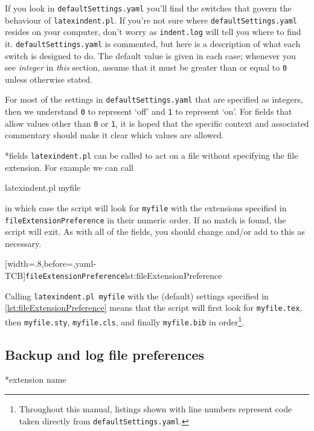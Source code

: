 \documentclass[10pt]{article}
\begin{document}
 If you look in \texttt{defaultSettings.yaml} you'll find the switches that govern the
 behaviour of \texttt{latexindent.pl}. If you're not sure where
 \texttt{defaultSettings.yaml} resides on your computer, don't worry as
 \texttt{indent.log} will tell you where to find it. \texttt{defaultSettings.yaml} is
 commented, but here is a description of what each switch is designed to do. The default
 value is given in each case; whenever you see \emph{integer} in \emph{this} section,
 assume that it must be greater than or equal to \texttt{0} unless otherwise stated.

 For most of the settings in \texttt{defaultSettings.yaml} that are specified as
 integers, then we understand \texttt{0} to represent `off' and \texttt{1} to represent
 `on'. For fields that allow values other than \texttt{0} or \texttt{1}, it is hoped that
 the specific context and associated commentary should make it clear which values are
 allowed.

*{fields}
 \texttt{latexindent.pl} can be called to
 act on a file without specifying the file extension. For example we can call

 \begin{commandshell}
latexindent.pl myfile
\end{commandshell}

 in which case the script will look for \texttt{myfile} with the extensions specified in
 \texttt{fileExtensionPreference} in their numeric order. If no match is found, the
 script will exit. As with all of the fields, you should change and/or add to this as
 necessary.

 [width=.8\linewidth,before=\centering,yaml-TCB]{\texttt{fileExtensionPreference}}{lst:fileExtensionPreference}

 Calling \texttt{latexindent.pl myfile} with the (default) settings specified in
 \cref{lst:fileExtensionPreference} means that the script will first look for
 \texttt{myfile.tex}, then \texttt{myfile.sty}, \texttt{myfile.cls}, and finally
 \texttt{myfile.bib} in order\footnote{Throughout this manual, listings shown with line
 numbers represent code taken directly from \texttt{defaultSettings.yaml}.}.


\subsection{Backup and log file preferences}
*{extension name}
\end{document}
